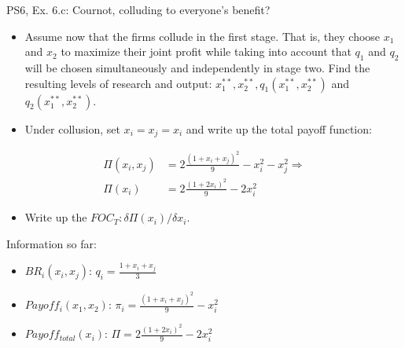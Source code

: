 \begin{frame}{PS6, Ex. 6.c: Cournot, colluding to everyone's benefit?}
    \begin{itemize}
    \item[(c)] Assume now that the firms collude in the first stage. That is, they choose $x_1$ and $x_2$ to maximize their joint profit while taking into account that $q_1$ and $q_2$ will be chosen simultaneously and independently in stage two. Find the resulting levels of research and output: $x_1^{**},x_2^{**},q_1(x_1^{**},x_2^{**})$ and $q_2(x_1^{**},x_2^{**})$.
    \end{itemize}
  \begin{multicols}{2}
    \begin{itemize}
      \item[(Step 1)] Under collusion, set $x_i=x_j=x_i$ and write up the total payoff function:
    \end{itemize}
    \begin{align*}
      \Pi(x_i,x_j)&=2\frac{(1+x_i+x_j)^2}{9}-x_i^2-x_j^2\Rightarrow\\
      \Pi(x_i)    &=2\frac{(1+2x_i)^2}{9}-2x_i^2
    \end{align*}
    \begin{itemize}
      \item[(Step 2)] Write up the $FOC_T:\delta\Pi(x_i)/\delta x_i$.
    \end{itemize}
    \vfill\null \columnbreak
    Information so far:
    \begin{itemize}
      \item[1] $BR_i(x_i,x_j)$: $q_i = \frac{1+x_i+x_j}{3}$
      \item[2] $Payoff_i(x_1,x_2)$: $\pi_i=\frac{(1+x_i+x_j)^2}{9}-x_i^2$
      \item[3] $Payoff_{total}(x_i)$: $\Pi=2\frac{(1+2x_i)^2}{9}-2x_i^2$
    \end{itemize}
    \vfill\null
  \end{multicols}
\end{frame}
